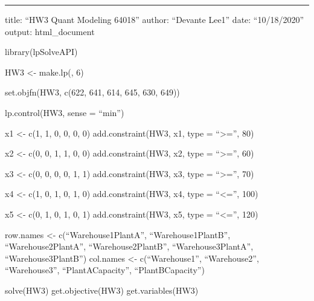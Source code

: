 \documentclass[
]{article}
\author{}
\date{\vspace{-2.5em}}
\begin{document}
\begin{center}\rule{0.5\linewidth}{0.5pt}\end{center}

title: ``HW3 Quant Modeling 64018'' author: ``Devante Lee1'' date:
``10/18/2020'' output: html\_document

library(lpSolveAPI)

HW3 \textless- make.lp(, 6)

set.objfn(HW3, c(622, 641, 614, 645, 630, 649))

lp.control(HW3, sense = ``min'')

x1 \textless- c(1, 1, 0, 0, 0, 0) add.constraint(HW3, x1, type =
``\textgreater='', 80)

x2 \textless- c(0, 0, 1, 1, 0, 0) add.constraint(HW3, x2, type =
``\textgreater='', 60)

x3 \textless- c(0, 0, 0, 0, 1, 1) add.constraint(HW3, x3, type =
``\textgreater='', 70)

x4 \textless- c(1, 0, 1, 0, 1, 0) add.constraint(HW3, x4, type =
``\textless='', 100)

x5 \textless- c(0, 1, 0, 1, 0, 1) add.constraint(HW3, x5, type =
``\textless='', 120)

row.names \textless- c(``Warehouse1PlantA'', ``Warehouse1PlantB'',
``Warehouse2PlantA'', ``Warehouse2PlantB'', ``Warehouse3PlantA'',
``Warehouse3PlantB'') col.names \textless- c(``Warehouse1'',
``Warehouse2'', ``Warehouse3'', ``PlantACapacity'', ``PlantBCapacity'')

solve(HW3) get.objective(HW3) get.variables(HW3)
\end{document}
